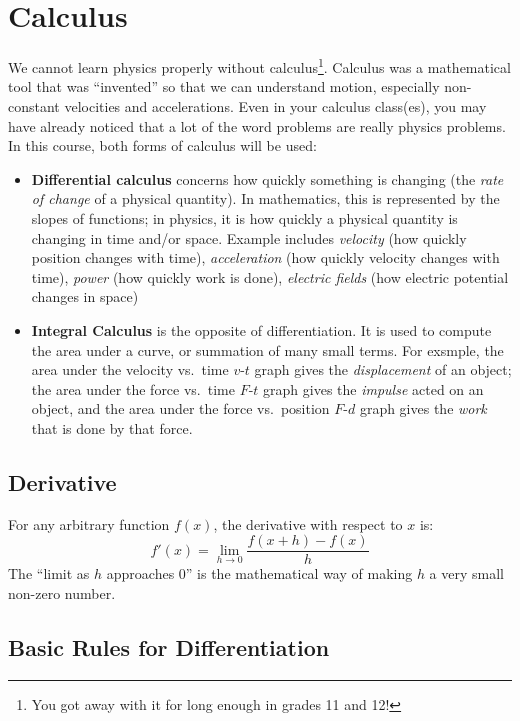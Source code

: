 \documentclass{../../../oss-handout}
\begin{document}
\section{Calculus}
We cannot learn physics properly without calculus\footnote{You got away with it
  for long enough in grades 11 and 12!}. Calculus was a mathematical tool that
was ``invented'' so that we can understand motion, especially non-constant
velocities and accelerations. Even in your calculus class(es), you may have
already noticed that a lot of the word problems  are really physics problems.
In this course, both forms of calculus will be used:
\begin{itemize}[nosep]
\item\textbf{Differential calculus} concerns how quickly something is changing
  (the \emph{rate of change} of a physical quantity). In mathematics, this is
  represented by the slopes of functions; in physics, it is how quickly a
  physical quantity is changing in time and/or space. Example includes
  \emph{velocity} (how quickly position changes with time), \emph{acceleration}
  (how quickly velocity changes with time), \emph{power} (how quickly work is
  done), \emph{electric fields} (how electric potential changes in space)
\item\textbf{Integral Calculus} is the opposite of differentiation. It is used
  to compute the area under a curve, or summation of many small terms. For
  exsmple, the area under the velocity vs.\ time $v$-$t$ graph gives the
  \emph{displacement} of an object; the area under the force vs.\ time
  $F$-$t$ graph gives the \emph{impulse} acted on an object, and the area
  under the force vs.\ position $F$-$d$ graph gives the \emph{work} that is
  done by that force.
\end{itemize}


\subsection{Derivative}

For any arbitrary function $f(x)$, the derivative with respect to $x$ is:
\begin{equation*}
  f'(x)=\lim_{h\rightarrow 0}\frac{f(x+h)-f(x)}{h}
\end{equation*}
The ``limit as $h$ approaches $0$'' is the mathematical way of making $h$ a
very small non-zero number.


\subsection{Basic Rules for Differentiation}
\end{document}

